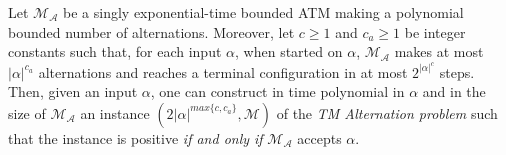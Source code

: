\begin{lemma}\label{lemma:AlernationsPolynomial} Let $\mathcal{M}_{\mathcal{A}}$ be a singly exponential-time bounded ATM making a polynomial bounded number of alternations. Moreover, let $c\geq 1$ and $c_a\geq 1$ be  integer constants such that, for each input $\alpha$, when started on $\alpha$,
$\mathcal{M}_{\mathcal{A}}$ makes at most $|\alpha|^{c_a}$ alternations and  reaches a terminal configuration in at most $2^{|\alpha|^{c}}$ steps. Then, given an input $\alpha$, one can construct in time polynomial in $\alpha$ and in the size of  $\mathcal{M}_{\mathcal{A}}$ an instance $(2|\alpha|^{\textit{max}\{c,c_a\}}, \mathcal{M})$ of the \emph{TM Alternation problem} such that the instance is positive \emph{if and only if} $\mathcal{M}_{\mathcal{A}}$ accepts $\alpha$.
\end{lemma}
